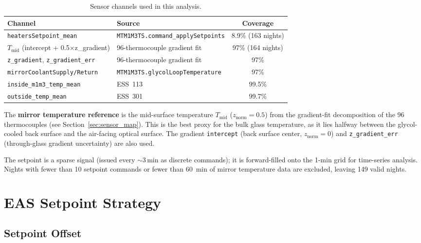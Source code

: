 \documentclass[11pt]{article}
\begin{document}
\begin{table}[htbp]
\centering
\caption{Sensor channels used in this analysis.}
\label{tab:channels}
\begin{tabular}{llc}
\toprule
Channel & Source & Coverage \\
\midrule
\texttt{heatersSetpoint\_mean} & \texttt{MTM1M3TS.command\_applySetpoints} & 8.9\% (163 nights) \\
$T_\mathrm{mid}$ (intercept + 0.5$\times$z\_gradient) & 96-thermocouple gradient fit & 97\% (164 nights) \\
\texttt{z\_gradient}, \texttt{z\_gradient\_err} & 96-thermocouple gradient fit & 97\% \\
\texttt{mirrorCoolantSupply/Return} & \texttt{MTM1M3TS.glycolLoopTemperature} & 97\% \\
\texttt{inside\_m1m3\_temp\_mean} & ESS~113 & 99.5\% \\
\texttt{outside\_temp\_mean} & ESS~301 & 99.7\% \\
\bottomrule
\end{tabular}
\end{table}

The \textbf{mirror temperature reference} is the mid-surface temperature
$T_\mathrm{mid}$ ($z_\mathrm{norm} = 0.5$) from the gradient-fit
decomposition of the 96 thermocouples (see Section~\ref{sec:sensor_map}).
This is the best proxy for the bulk glass temperature, as it lies
halfway between the glycol-cooled back surface and the air-facing
optical surface.  The gradient \texttt{intercept} (back surface center,
$z_\mathrm{norm} = 0$) and \texttt{z\_gradient\_err} (through-glass
gradient uncertainty) are also used.

The setpoint is a sparse signal (issued every $\sim$3\,min as discrete
commands); it is forward-filled onto the 1-min grid for time-series
analysis.  Nights with fewer than 10 setpoint commands or fewer than
60~min of mirror temperature data are excluded, leaving 149 valid nights.

\section{EAS Setpoint Strategy}

\subsection{Setpoint Offset}
\end{document}
